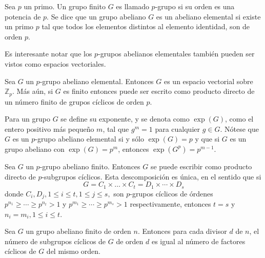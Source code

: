 \begin{definicion}
Sea $p$ un primo. Un grupo finito $G$ es llamado $p$-grupo si su orden es una potencia de $p$.
Se dice que un grupo abeliano $G$ es un abeliano elemental si existe un primo $p$ tal que todos los elementos distintos al elemento identidad, son de orden $p$.
\end{definicion}
Es interesante notar que los $p$-grupos abelianos elementales también pueden ser vistos como espacios vectoriales.
\begin{lema}
Sea $G$ un $p$-grupo abeliano elemental. Entonces $G$ es un espacio vectorial sobre $\mathds{Z}_p$. Más aún, si $G$ es finito entonces puede ser escrito como producto directo de un número finito de grupos cíclicos de orden $p$.

\end{lema}
Para un grupo $G$ se define su exponente, y se denota como $\exp(G)$, como el entero positivo más pequeño $m$, tal que $g^m=1$ para cualquier $g \in G$. Nótese que $G$ es un $p$-grupo abeliano elemental si y sólo $\exp(G)=p$ y que si $G$ es un grupo abeliano con $\exp(G) = p^m$, entonces $\exp(G^p) = p^{m-1}$.
\begin{teorema}\label{teo:estructuraAbelianos}
Sea $G$ un $p$-grupo abeliano finito. Entonces $G$ se puede escribir como producto directo de $p$-subgrupos cíclicos. Esta descomposición es única, en el sentido que si
\[ G = C_1 \times \dots \times C_t = D_1 \times \cdots \times D_s \]
donde $C_i,D_j, 1\leq i \leq t, 1\leq j \leq s,$ son $p$-grupos cíclicos de órdenes $p^{n_1} \geq \cdots \geq p^{n_t}>1$ y $p^{m_1}\geq \cdots \geq p^{m_s}>1$ respectivamente, entonces $t=s$ y $n_i = m_i, 1\leq i \leq t$.
\end{teorema} 
\begin{proposicion}
Sea $G$ un grupo abeliano finito de orden $n$. Entonces para cada divisor $d$ de $n$, el número de subgrupos cíclicos de $G$ de orden $d$ es igual al número de factores cíclicos de $G$ del mismo orden.
\end{proposicion}

